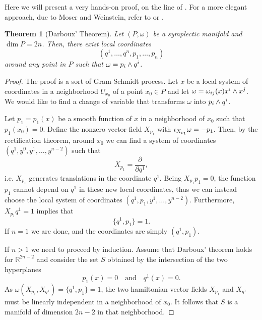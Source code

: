 \documentclass[english,fontsize=11pt,paper=a5,oneside]{scrbook}
\newcommand{\R}{\mathbb{R}}
\let\d\relax
\DeclareMathOperator{\d}{d}
\newtheorem{theorem}{Theorem}[chapter]
\theoremstyle{definition}
\begin{document}
Here we will present a very hands-on proof, on the line of \cite[Problem 22-19]{book:lee}. For a more elegant approach, due to Moser and Weinstein, refer to \cite[Chapter 22]{book:lee} or \cite[Chapter 10.3]{book:knauf}.

\begin{theorem}[Darboux' Theorem]
    Let $(P, \omega)$ be a symplectic manifold and $\dim P = 2n$.
    Then, there exist local coordinates
    \begin{equation}
        (q^1, \ldots, q^n, p_1, \ldots, p_n)
    \end{equation} around any point in $P$ such that $\omega = \d p_i \wedge \d q^i$.
\end{theorem}
\begin{proof}
    The proof is a sort of Gram-Schmidt process.
    Let $x$ be a local system of coordinates in a neighborhood $U_{x_0}$ of a point $x_0\in P$ and let $\omega = \omega_{ij}(x)\d x^i\wedge \d x^j$.
    We would like to find a change of variable that transforms $\omega$ into $\d p_i \wedge \d q^i$.

    Let $p_1=p_1(x)$ be a smooth function of $x$ in a neighborhood of $x_0$ such that $p_1(x_0) = 0$.
    Define the nonzero vector field $X_{p_1}$ with $\iota_{X_{p_1}}\omega = -\d p_1$.
    Then, by the rectification theorem, around $x_0$ we can find a system of coordinates $(q^1, y^0, y^1, \ldots, y^{n-2})$ such that
    \begin{equation}
        X_{p_1} = \frac{\partial}{\partial q^1},
    \end{equation}
    i.e. $X_{p_1}$ generates translations in the coordinate $q^1$.
    Being $X_{p_1} p_1 = 0$, the function $p_1$ cannot depend on $q^1$ in these new local coordinates, thus we can instead choose the local system of coordinates $(q^1, p_1, y^1, \ldots, y^{n-2})$.
    Furthermore, $X_{p_1} q^1 = 1$ implies that
    \begin{equation}
        \big\{q^1, p_1\big\} = 1.
    \end{equation}
    If $n=1$ we are done, and the coordinates are simply $(q^1, p_1)$.
    
    If $n>1$ we need to proceed by induction.
    Assume that Darboux' theorem holds for $\R^{2n-2}$ and consider the set $S$ obtained by the intersection of the two hyperplanes
    \begin{equation}
        p_1(x) = 0 \quad\mbox{and}\quad q^1(x) = 0.
    \end{equation}
    As $\omega(X_{p_1}, X_{q^1}) = \big\{q^1, p_1\big\} = 1$, the two hamiltonian vector fields $X_{p_1}$ and $X_{q^1}$ must be linearly independent in a neighborhood of $x_0$. It follows that $S$ is a manifold of dimension $2n-2$ in that neighborhood.


\end{proof}
\end{document}
